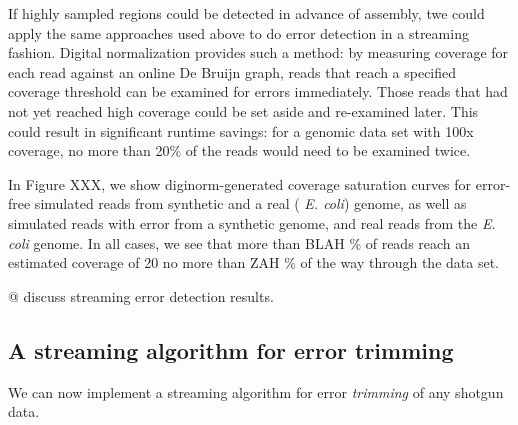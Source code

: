 If highly sampled regions could be detected in advance of assembly,
twe could apply the same approaches used above to do error detection
in a streaming fashion.  Digital normalization provides such a method:
by measuring coverage for each read against an online De Bruijn graph,
reads that reach a specified coverage threshold can be examined for
errors immediately.  Those reads that had not yet reached high
coverage could be set aside and re-examined later.  This could result
in significant runtime savings: for a genomic data set with 100x
coverage, no more than 20\% of the reads would need to be examined
twice.

In Figure XXX, we show diginorm-generated coverage saturation curves
for error-free simulated reads from synthetic and a real ({\em
  E. coli}) genome, as well as simulated reads with error from a
synthetic genome, and real reads from the {\em E. coli} genome.  In
all cases, we see that more than BLAH \% of reads reach an estimated
coverage of 20 no more than ZAH \% of the way through the data set.

@ discuss streaming error detection results.

\subsection{A streaming algorithm for error trimming}

We can now implement a streaming algorithm for error {\em trimming} of
any shotgun data.


